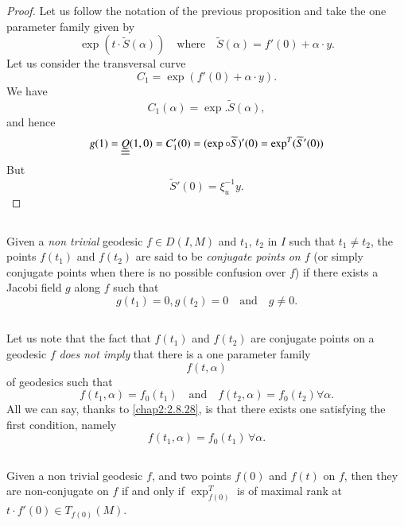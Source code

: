 \begin{proof}
Let us follow the notation of the previous proposition and take the
one parameter family given by 
$$
\exp (t\cdot\widetilde{S}(\alpha))\quad\text{where}\quad \widetilde{S}(\alpha)=f'(0)+\alpha\cdot y.
$$\pageoriginale
Let us consider the transversal curve
$$
C_{1}=\exp(f'(0)+\alpha\cdot y).
$$
We have
$$
C_{1}(\alpha)=\exp.\widetilde{S}(\alpha),
$$
and hence
$$
g(1)=\underline{\underline{Q}}(1,0)=C'_{1}(0)=(\exp\circ \widetilde{S})'(0)=\exp^{T}(\widetilde{S}'(0)) 
$$
But
$$
\widetilde{S}'(0)=\xi^{-1}_{u}y.
$$
\end{proof}

\subsection{}\label{chap2:2.8.30}

\begin{defi*}
Given a {\em non trivial} geodesic $f\in D(I,M)$ and $t_{1}$, $t_{2}$
in $I$ such that $t_{1}\neq t_{2}$, the points $f(t_{1})$ and
$f(t_{2})$ are said to be {\em conjugate points on $f$} (or simply
conjugate points when there is no possible confusion over $f$) if
there exists a Jacobi field $g$ along $f$ such that 
$$
g(t_{1})=0, g(t_{2})=0\quad\text{and}\quad g\neq 0.
$$
\end{defi*}

\subsection{}\label{chap2:2.8.31}

\begin{remark*}
Let us note that the fact that $f(t_{1})$ and $f(t_{2})$ are conjugate
points on a geodesic $f$ {\em does not imply} that there is a one
parameter family
$$
f(t,\alpha)
$$
of geodesics such that
$$
f(t_{1},\alpha)=f_{0}(t_{1})\quad\text{and}\quad
f(t_{2},\alpha)=f_{0}(t_{2})\forall \alpha.
$$
All we can say, thanks to \ref{chap2:2.8.28}, is that there exists one
satisfying the first condition, namely
$$
f(t_{1},\alpha)=f_{0}(t_{1}) \, \forall \alpha.
$$
\end{remark*}


\subsection{}\label{chap2:2.8.32}

\begin{coro*}
Given \pageoriginale a non trivial geodesic $f$, and two points $f(0)$
and $f(t)$ on $f$, then they are non-conjugate on $f$ if and only if
$\exp^{T}_{f(0)}$ is of maximal rank at $t\cdot f'(0)\in T_{f(0)}(M)$.
\end{coro*}

